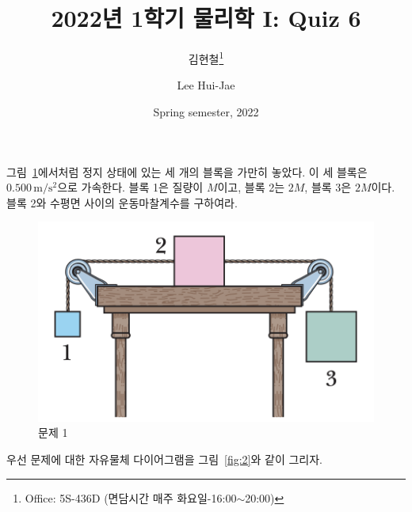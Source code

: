 \documentclass[floatfix,nofootinbib,superscriptaddress,fleqn]{revtex4-2}
\begin{document}
\title{\Large 2022년 1학기 물리학 I: Quiz 6}
\author{김현철\footnote{Office: 5S-436D (면담시간 매주
    화요일-16:00$\sim$20:00)}} 
\author{Lee Hui-Jae} 
\date{Spring semester, 2022}


\vspace{1.cm}

\maketitle

그림~\ref{fig:1}에서처럼 정지 상태에 있는 세 개의 블록을 가만히
놓았다. 이 세 블록은 $0.500\,\mathrm{m/s^2}$으로 가속한다. 블록 1은
질량이 $M$이고, 블록 2는 $2M$, 블록 3은 $2M$이다. 블록 2와 수평면
사이의 운동마찰계수를 구하여라.
\begin{figure}[ht]
  \centering
\includegraphics[scale=0.43]{Qfig6-1-20220321.png}  
  \caption{문제 1}
  \label{fig:1}
\end{figure}

우선 문제에 대한 자유물체 다이어그램을 그림~\ref{fig:2}와 같이
그리자. 
\end{document}
